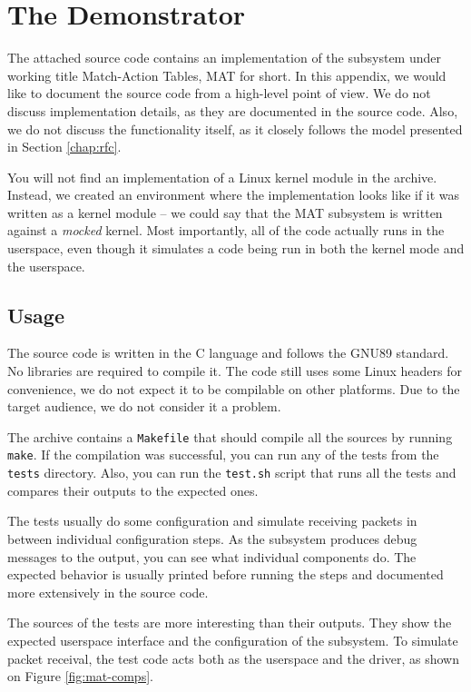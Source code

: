 \chapter{The Demonstrator}
\label{app:doc}

The attached source code contains an implementation of the subsystem under
working title Match-Action Tables, MAT for short. In this appendix, we would
like to document the source code from a high-level point of view. We do not
discuss implementation details, as they are documented in the source code.
Also, we do not discuss the functionality itself, as it closely follows the
model presented in Section \ref{chap:rfc}.

You will not find an implementation of a Linux kernel module in the archive.
Instead, we created an environment where the implementation looks like if it
was written as a kernel module -- we could say that the MAT subsystem is
written against a \emph{mocked} kernel. Most importantly, all of the code
actually runs in the userspace, even though it simulates a code being run in
both the kernel mode and the userspace.

\section{Usage}

The source code is written in the C language and follows the GNU89 standard.
No libraries are required to compile it. The code still uses some Linux
headers for convenience, we do not expect it to be compilable on other
platforms. Due to the target audience, we do not consider it a problem.

The archive contains a \texttt{Makefile} that should compile all the sources by
running \texttt{make}. If the compilation was successful, you can run any of
the tests from the \texttt{tests} directory. Also, you can run the
\texttt{test.sh} script that runs all the tests and compares their outputs to
the expected ones.

The tests usually do some configuration and simulate receiving packets in
between individual configuration steps. As the subsystem produces debug messages to the
output, you can see what individual components do. The expected behavior is
usually printed before running the steps and documented more extensively in
the source code.

The sources of the tests are more interesting than their outputs. They show
the expected userspace interface and the configuration of the subsystem. To
simulate packet receival, the test code acts both as the userspace and the
 driver, as shown on Figure \ref{fig:mat-comps}.

